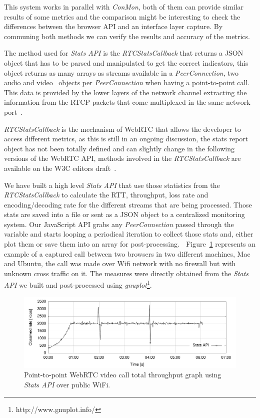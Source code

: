 This system works in parallel with {\it ConMon}, both of them can provide similar results of some metrics and the comparison might be interesting to check the differences between the browser API and an interface layer capture. By communing both methods we can verify the results and accuracy of the metrics.

The method used for {\it Stats API} is the {\it RTCStatsCallback} that returns a JSON object that has to be parsed and manipulated to get the correct indicators, this object returns as many arrays as streams available in a {\it PeerConnection}, two audio and video~\cite{editorWebRTCdraft} objects per {\it PeerConnection} when having a point-to-point call. This data is provided by the lower layers of the network channel extracting the information from the RTCP packets that come multiplexed in the same network port~\cite{rtpusageIETF}.

{\it RTCStatsCallback} is the mechanism of WebRTC that allows the developer to access different metrics, as this is still in an ongoing discussion, the stats report object has not been totally defined and can slightly change in the following versions of the WebRTC API, methods involved in the {\it RTCStatsCallback} are available on the W3C editors draft~\cite{editorWebRTCdraft}. 

We have built a high level {\it Stats API} that use those statistics from the {\it RTCStatsCallback} to calculate the RTT, throughput, loss rate and encoding/decoding rate for the different streams that are being processed. Those stats are saved into a file or sent as a JSON object to a centralized monitoring system. Our JavaScript API grabs any {\it PeerConnection} passed through the variable and starts looping a periodical iteration to collect those stats and, either plot them or save them into an array for post-processing. 

Figure~\ref{fig:onetooneWifiRTC} represents an example of a captured call between two browsers in two different machines, Mac and Ubuntu, the call was made over Wifi network with no firewall but with unknown cross traffic on it. The measures were directly obtained from the {\it Stats API} we built and post-processed using {\it gnuplot}\footnote{http://www.gnuplot.info/}.

 \begin{figure}[h]
  \centering
    \includegraphics[width=1\textwidth]{./figures/onetooneWifiStatsRTC.pdf}
      \caption[Point-to-point WebRTC video call total throughput graph using {\it Stats API} over public WiFi]{Point-to-point WebRTC video call total throughput graph using {\it Stats API} over public WiFi.}
	\label{fig:onetooneWifiRTC}
\end{figure}

